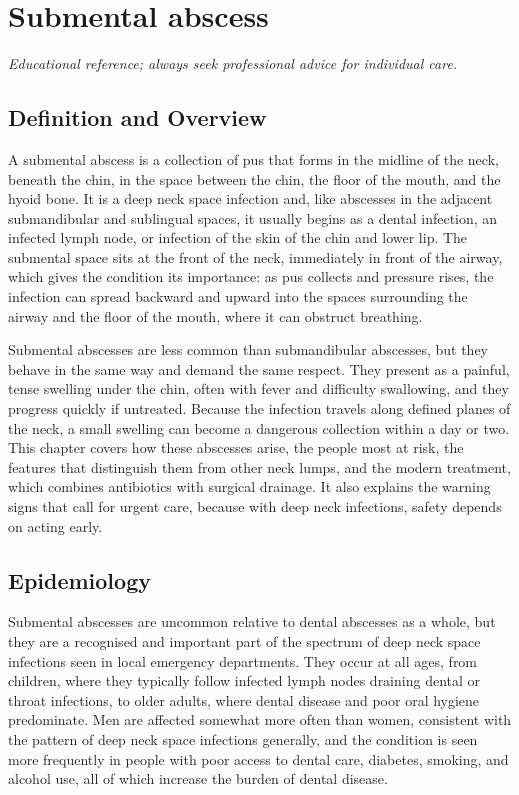 \chapter{Submental abscess}

\medskip
\noindent\textit{Educational reference; always seek professional advice for individual care.}

\section*{Definition and Overview}
A submental abscess is a collection of pus that forms in the midline of the neck, beneath the chin, in the space between the chin, the floor of the mouth, and the hyoid bone. It is a deep neck space infection and, like abscesses in the adjacent submandibular and sublingual spaces, it usually begins as a dental infection, an infected lymph node, or infection of the skin of the chin and lower lip. The submental space sits at the front of the neck, immediately in front of the airway, which gives the condition its importance: as pus collects and pressure rises, the infection can spread backward and upward into the spaces surrounding the airway and the floor of the mouth, where it can obstruct breathing.

Submental abscesses are less common than submandibular abscesses, but they behave in the same way and demand the same respect. They present as a painful, tense swelling under the chin, often with fever and difficulty swallowing, and they progress quickly if untreated. Because the infection travels along defined planes of the neck, a small swelling can become a dangerous collection within a day or two. This chapter covers how these abscesses arise, the people most at risk, the features that distinguish them from other neck lumps, and the modern treatment, which combines antibiotics with surgical drainage. It also explains the warning signs that call for urgent care, because with deep neck infections, safety depends on acting early.

\section*{Epidemiology}
Submental abscesses are uncommon relative to dental abscesses as a whole, but they are a recognised and important part of the spectrum of deep neck space infections seen in local emergency departments. They occur at all ages, from children, where they typically follow infected lymph nodes draining dental or throat infections, to older adults, where dental disease and poor oral hygiene predominate. Men are affected somewhat more often than women, consistent with the pattern of deep neck space infections generally, and the condition is seen more frequently in people with poor access to dental care, diabetes, smoking, and alcohol use, all of which increase the burden of dental disease.

